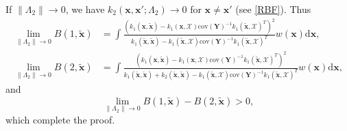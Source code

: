 \documentclass[11pt]{article}
\begin{document}
If $\|\Lambda_2\| \rightarrow 0$, we have $k_2(\mathbf{x}, \mathbf{x}'; \Lambda_2) \rightarrow 0 $ for $\mathbf{x} \neq \mathbf{x}'$ (see \eqref{RBF}). Thus 
\begin{align}
    \lim_{\|\Lambda_2\| \to 0} B(1, \tilde{\mathbf{x}}) & = \int \frac{(k_1(\mathbf{x}, \tilde{\mathbf{x}})- k_1(\mathbf{x}, \mathcal{X}) \mathrm{cov}(\mathbf{Y})^{-1} k_1(\tilde{\mathbf{x}}, \mathcal{X})^T)^2}
    {k_1(\tilde{\mathbf{x}}, \tilde{\mathbf{x}}) - k_1(\tilde{\mathbf{x}}, \mathcal{X})\mathrm{cov}(\mathbf{Y})^{-1} k_1(\tilde{\mathbf{x}}, \mathcal{X})^T}
    w(\mathbf{x}) \mathrm{d} \mathbf{x},
\\ 
    \lim_{\|\Lambda_2\| \to 0} B(2, \tilde{\mathbf{x}}) 
    & = \int \frac{(k_1(\mathbf{x}, \tilde{\mathbf{x}})- k_1(\mathbf{x}, \mathcal{X}) \mathrm{cov}(\mathbf{Y})^{-1} k_1(\tilde{\mathbf{x}}, \mathcal{X})^T)^2}
    {k_1(\tilde{\mathbf{x}}, \tilde{\mathbf{x}}) + k_2(\tilde{\mathbf{x}}, \tilde{\mathbf{x}}) - k_1(\tilde{\mathbf{x}}, \mathcal{X})\mathrm{cov}(\mathbf{Y})^{-1} k_1(\tilde{\mathbf{x}}, \mathcal{X})^T}
    w(\mathbf{x}) \mathrm{d} \mathbf{x},
\end{align}
and
\begin{equation}
    \lim_{\|\Lambda_2\| \to 0} B(1, \tilde{\mathbf{x}}) - B(2, \tilde{\mathbf{x}}) > 0,
\end{equation}
which complete the proof. 
\end{document}
